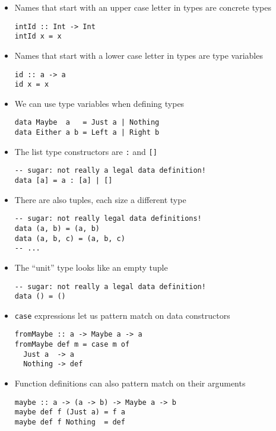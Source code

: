 \begin{itemize}
\item Names that start with an upper case letter in types are concrete
  types
\begin{verbatim}
intId :: Int -> Int
intId x = x
\end{verbatim}

\item Names that start with a lower case letter in types are type
  variables
\begin{verbatim}
id :: a -> a
id x = x
\end{verbatim}

\item We can use type variables when defining types
\begin{verbatim}
data Maybe  a   = Just a | Nothing
data Either a b = Left a | Right b
\end{verbatim}

\item The list type constructors are \verb|:| and \verb|[]|
\begin{verbatim}
-- sugar: not really a legal data definition!
data [a] = a : [a] | []
\end{verbatim}

\item There are also tuples, each size a different type
\begin{verbatim}
-- sugar: not really legal data definitions!
data (a, b) = (a, b)
data (a, b, c) = (a, b, c)
-- ...
\end{verbatim}

\item The ``unit'' type looks like an empty tuple
\begin{verbatim}
-- sugar: not really a legal data definition!
data () = ()
\end{verbatim}

\item \verb|case| expressions let us pattern match on data
  constructors
\begin{verbatim}
fromMaybe :: a -> Maybe a -> a
fromMaybe def m = case m of
  Just a  -> a
  Nothing -> def
\end{verbatim}

\item Function definitions can also pattern match on their arguments
\begin{verbatim}
maybe :: a -> (a -> b) -> Maybe a -> b
maybe def f (Just a) = f a
maybe def f Nothing  = def
\end{verbatim}


\end{itemize}
